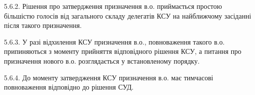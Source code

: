     5.6.2. Рішення про затвердження призначення в.о. приймається простою більшістю голосів від загального складу делегатів КСУ на найближчому засіданні після такого призначення.

    5.6.3. У разі відхилення КСУ призначення в.о., повноваження такого в.о. припиняються з моменту прийняття відповідного рішення КСУ, а питання про призначення нового в.о. розглядається у встановленому порядку.

    5.6.4. До моменту затвердження КСУ призначення в.о. має тимчасові повноваження відповідно до рішення СУД.